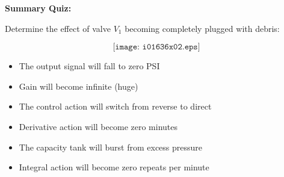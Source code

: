 \vfil \eject

\noindent
{\bf Summary Quiz:}

Determine the effect of valve $V_1$ becoming completely plugged with debris:

$$\texttt{[image: i01636x02.eps]}$$

\begin{itemize}
\item{} The output signal will fall to zero PSI
\vskip 5pt 
\item{} Gain will become infinite (huge)
\vskip 5pt 
\item{} The control action will switch from reverse to direct
\vskip 5pt 
\item{} Derivative action will become zero minutes
\vskip 5pt 
\item{} The capacity tank will burst from excess pressure
\vskip 5pt 
\item{} Integral action will become zero repeats per minute
\end{itemize}




